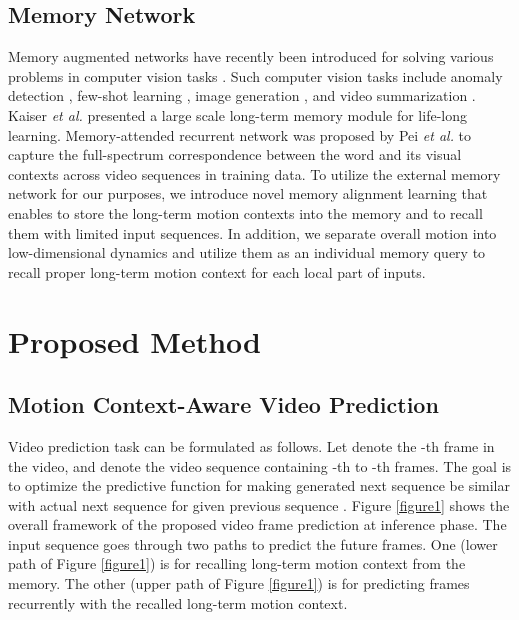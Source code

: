 \documentclass[final]{cvpr}
\begin{document}
\subsection{Memory Network}
Memory augmented networks have recently been introduced for solving various problems in computer vision tasks \cite{gong2019memorizing, kaiser2017learning,cai2018memory,zhu2019dm,lee2018memory,pei2019memory, zhu2020inflated,han2020memory,lai2020mast,park2020learning}. Such computer vision tasks include anomaly detection \cite{gong2019memorizing,park2020learning}, few-shot learning \cite{kaiser2017learning, cai2018memory, zhu2020inflated}, image generation \cite{zhu2019dm}, and video summarization \cite{lee2018memory}. Kaiser \textit{et al.} \cite{kaiser2017learning} presented a large scale long-term memory module for life-long learning. Memory-attended recurrent network was proposed by Pei \textit{et al.} \cite{pei2019memory} to capture the full-spectrum correspondence between the word and its visual contexts across video sequences in training data. To utilize the external memory network for our purposes, we introduce novel memory alignment learning that enables to store the long-term motion contexts into the memory and to recall them with limited input sequences. In addition, we separate overall motion into low-dimensional dynamics and utilize them as an individual memory query to recall proper long-term motion context for each local part of inputs.

\section{Proposed Method}
\subsection{Motion Context-Aware Video Prediction}
Video prediction task can be formulated as follows. Let    denote the -th frame in the video, and    denote the video sequence containing -th to -th frames. The goal is to optimize the predictive function  for making generated next sequence  be similar with actual next sequence  for given previous sequence . Figure \ref{figure1} shows the overall framework of the proposed video frame prediction at inference phase. The input sequence goes through two paths to predict the future frames. One (lower path of Figure \ref{figure1}) is for recalling long-term motion context from the memory. The other (upper path of Figure \ref{figure1}) is for predicting frames recurrently with the recalled long-term motion context.  
\end{document}
